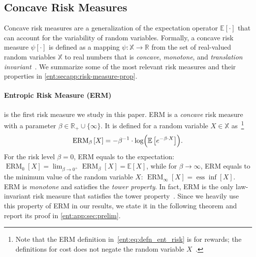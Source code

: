 \documentclass[twoside]{article}
\newcommand{\E}{\mathbb{E}}
\newcommand{\erm}[2]{\operatorname{ERM}_{#1}\left[#2\right]}
\newcommand{\risko}{\psi}
\newcommand{\Real}{\mathbb{R}}
\theoremstyle{plain}
\theoremstyle{definition}
\theoremstyle{remark}
\renewcommand{\cite}[1]{\citep{#1}}
\begin{document}

\subsection{Concave Risk Measures}
\label{ent:subsec:risk-measure}

Concave risk measures are a generalization of the expectation operator $\E[\cdot]$ that can account for the variability of random variables. Formally, a concave risk measure $\psi[\cdot]$ is defined as a mapping $\risko\colon \mathbb{X} \to \mathbb{R}$ from the set of real-valued random variables $\mathbb{X}$ to real numbers that is \emph{concave}, \emph{monotone}, and \emph{translation invariant}~\cite{Follmer2016}. We summarize some of the most relevant risk measures and their properties in \cref{ent:secapp:risk-measure-prop}.

\paragraph{Entropic Risk Measure (ERM)} is the first risk measure we study in this paper. ERM is a {\em concave} risk measure with a parameter $\beta\in \Real_+ \cup \{\infty\}$. It is defined for a random variable $X \in \mathbb{X}$ as~\cite{Follmer2016}\footnote{Note that the ERM definition in~\eqref{ent:eq:defn_ent_risk} is for rewards; the definitions for cost does not negate the random variable $X$~\cite{Follmer2016,Shapiro2014}.}
%
\begin{align} \label{ent:eq:defn_ent_risk}
  \erm{\beta}{X} = - \beta^{-1} \cdot \log \Bigl( \E \left[e^{-\beta\cdot  X} \right] \Bigr).
\end{align}
% 
For the risk level $\beta=0$, ERM equals to the expectation: $ \erm{0}{X} = \lim_{\beta \to 0^{+}} \erm{\beta}{X} = \E[X] $, while for $\beta\rightarrow\infty$, ERM equals to the minimum value of the random variable $X$: $\erm{\infty}{X} = \operatorname{ess} \inf[X]$. %
ERM is {\em monotone} and satisfies the {\em tower property}. In fact, ERM is the only law-invariant risk measure that satisfies the tower property~\cite{Kupper2006}. Since we heavily use this property of ERM in our results, we state it in the following theorem and report its proof in \cref{ent:app:sec:prelim}. 
\end{document}
